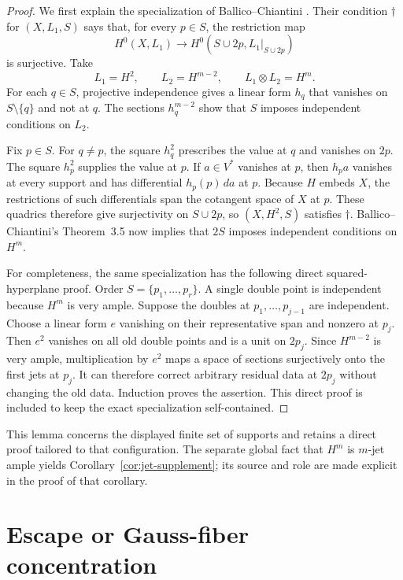 \documentclass[11pt]{article}
\begin{document}
\begin{proof}
We first explain the specialization of Ballico--Chiantini
\cite[Definition~3.1 and Theorem~3.5]{BallicoChiantini2021}.  Their condition
$\dagger$ for $(X,L_1,S)$ says that, for every $p\in S$, the restriction map
\[
 H^0(X,L_1)\longrightarrow H^0(S\cup2p,L_1|_{S\cup2p})
\]
is surjective.  Take
\[
 L_1=H^2,\qquad L_2=H^{m-2},\qquad L_1\otimes L_2=H^m.
\]
For each $q\in S$, projective independence gives a linear form $h_q$ that
vanishes on $S\setminus\{q\}$ and not at $q$.  The sections
$h_q^{m-2}$ show that $S$ imposes independent conditions on $L_2$.

Fix $p\in S$.  For $q\neq p$, the square $h_q^2$ prescribes the value at
$q$ and vanishes on $2p$.  The square $h_p^2$ supplies the value at $p$.
If $a\in V^*$ vanishes at $p$, then $h_pa$ vanishes at every support and
has differential $h_p(p)\,da$ at $p$.  Because $H$ embeds $X$, the
restrictions of such differentials span the cotangent space of $X$ at $p$.
These quadrics therefore give surjectivity on $S\cup2p$, so
$(X,H^2,S)$ satisfies $\dagger$.  Ballico--Chiantini's Theorem~3.5 now
implies that $2S$ imposes independent conditions on $H^m$.

For completeness, the same specialization has the following direct
squared-hyperplane proof.  Order $S=\{p_1,\ldots,p_r\}$.  A single double
point is independent because $H^m$ is very ample.  Suppose the doubles at
$p_1,\ldots,p_{j-1}$ are independent.  Choose a linear form $e$ vanishing
on their representative span and nonzero at $p_j$.  Then $e^2$ vanishes on
all old double points and is a unit on $2p_j$.  Since $H^{m-2}$ is very
ample, multiplication by $e^2$ maps a space of sections surjectively onto
the first jets at $p_j$.  It can therefore correct arbitrary residual data
at $2p_j$ without changing the old data.  Induction proves the assertion.
This direct proof is included to keep the exact specialization
self-contained.
\end{proof}

This lemma concerns the displayed finite set of supports and retains a direct
proof tailored to that configuration.  The separate global fact that $H^m$ is
$m$-jet ample yields Corollary~\ref{cor:jet-supplement}; its source and role are
made explicit in the proof of that corollary.

\section{Escape or Gauss-fiber concentration}\label{sec:escape}
\end{document}
